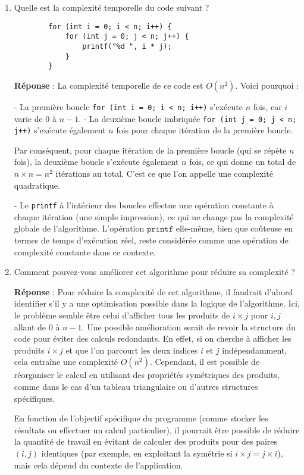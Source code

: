 \begin{enumerate}
\begin{enumerate}
	\end{enumerate}
	
	\item Quelle est la complexité temporelle du code suivant ?
	\begin{lstlisting}
		for (int i = 0; i < n; i++) {
			for (int j = 0; j < n; j++) {
				printf("%d ", i * j);
			}
		}
	\end{lstlisting}
	
	\textbf{Réponse} :
	La complexité temporelle de ce code est $O(n^2)$. Voici pourquoi :
	
	- La première boucle \texttt{for (int i = 0; i < n; i++)} s'exécute $n$ fois, car $i$ varie de $0$ à $n-1$.
	- La deuxième boucle imbriquée \texttt{for (int j = 0; j < n; j++)} s'exécute également $n$ fois pour chaque itération de la première boucle.
	
	Par conséquent, pour chaque itération de la première boucle (qui se répète $n$ fois), la deuxième boucle s'exécute également $n$ fois, ce qui donne un total de $n \times n = n^2$ itérations au total. C'est ce que l'on appelle une complexité quadratique.
	
	- Le \texttt{printf} à l'intérieur des boucles effectue une opération constante à chaque itération (une simple impression), ce qui ne change pas la complexité globale de l'algorithme. L'opération $\texttt{printf}$ elle-même, bien que coûteuse en termes de temps d'exécution réel, reste considérée comme une opération de complexité constante dans ce contexte.
	
	\item Comment pouvez-vous améliorer cet algorithme pour réduire sa complexité ?
	
	\textbf{Réponse} :
	Pour réduire la complexité de cet algorithme, il faudrait d'abord identifier s'il y a une optimisation possible dans la logique de l'algorithme. Ici, le problème semble être celui d'afficher tous les produits de $i \times j$ pour $i, j$ allant de $0$ à $n-1$. 
	Une possible amélioration serait de revoir la structure du code pour éviter des calculs redondants. En effet, si on cherche à afficher les produits $i \times j$ et que l'on parcourt les deux indices $i$ et $j$ indépendamment, cela entraîne une complexité $O(n^2)$. Cependant, il est possible de réorganiser le calcul en utilisant des propriétés symétriques des produits, comme dans le cas d'un tableau triangulaire ou d'autres structures spécifiques.
	
	En fonction de l'objectif spécifique du programme (comme stocker les résultats ou effectuer un calcul particulier), il pourrait être possible de réduire la quantité de travail en évitant de calculer des produits pour des paires $(i, j)$ identiques (par exemple, en exploitant la symétrie si $i \times j = j \times i$), mais cela dépend du contexte de l'application.
\end{enumerate}

